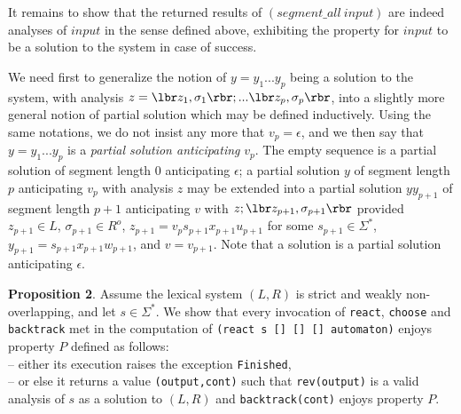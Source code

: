 It remains to show that the returned results 
of $(segment\_all ~input)$ are indeed analyses of $input$
in the sense defined above, exhibiting the property for
$input$ to be a solution to the system in case of success.

We need first to generalize the notion of $y=y_1 ... y_p$ being a solution
to the system, with analysis $z=\lbr z_1,\sigma_1\rbr 
;...\lbr z_p,\sigma_p\rbr $, into a 
slightly more general notion of partial solution which may be defined
inductively. Using the same notations, we do not insist any more that
$v_p=\epsilon$, and we then say that $y=y_1 ... y_p$ is a {\sl partial
solution anticipating} $v_p$. The empty sequence is a partial solution
of segment length $0$ anticipating $\epsilon$; a partial solution $y$ of
segment length $p$ anticipating $v_p$ with analysis 
$z$ may be extended into a partial solution $y y_{p+1}$
of segment length $p+1$ anticipating $v$ with
$z;\lbr z_{p+1},\sigma_{p+1}\rbr $ provided $z_{p+1}\in L$, 
$\sigma_{p+1}\in R^o$,
$z_{p+1}=v_p s_{p+1} x_{p+1} u_{p+1}$
for some $s_{p+1}\in\Sigma^*$,
$y_{p+1}=s_{p+1} x_{p+1} w_{p+1}$, and $v=v_{p+1}$. 
Note that a solution is a partial solution anticipating $\epsilon$.

\noindent
{\bf Proposition 2}. Assume the lexical system $(L,R)$ is strict
and weakly non-overlap\-ping, and
let $s\in\Sigma^*$. We show that every invocation of \verb:react:, 
\verb:choose: and \verb:backtrack: met in the computation of
\verb:(react s [] [] [] automaton): enjoys property $P$ defined as follows:\\
-- either its execution raises the exception \verb:Finished:,\\ 
-- or else it returns a value \verb:(output,cont): such that
\verb:rev(output): is a valid analysis of $s$ as a solution to $(L,R)$
and \verb:backtrack(cont): enjoys property $P$.

